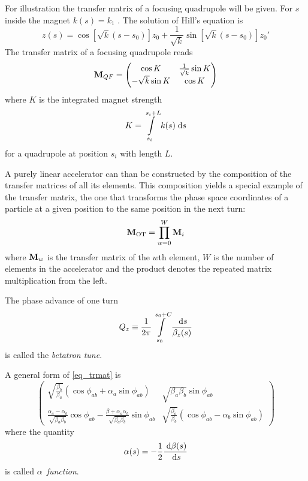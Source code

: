 For illustration the transfer matrix of a focusing quadrupole will be given.
For $s$ inside the magnet $k(s) = k_1$ . The solution of Hill's equation is
%
\begin{equation}
    z(s) = \cos \left[ \sqrt{k}(s-s_0)\right] z_0 + \frac{1}{\sqrt{k}}\sin\left[\sqrt{k}(s-s_0)\right]z_0'
\end{equation}
%
The transfer matrix of a focusing quadrupole reads
%
\begin{equation}
    \mathbf{M}_{QF} =
    \begin{pmatrix}
        \cos K & \frac{1}{\sqrt{k}} \sin K \\
        -\sqrt{k}\sin K & \cos K
    \end{pmatrix}
\end{equation}
%
where $K$ is the integrated magnet strength
%
\begin{equation}
    K = \int\limits_{s_i}^{s_i + L} k(s)\;\text{d} s
\end{equation}
%
for a quadrupole at position $s_i$ with length $L$.

A purely linear accelerator can than be constructed by the composition of the transfer matrices of 
all its elements. This composition yields a special example of the transfer matrix, the one that
transforms the phase space coordinates of a particle at a given position to the same position in the
next turn:
%
\begin{equation}
    \mathbf{M}_\text{OT} = \prod\limits_{w=0}^W \mathbf{M}_i
\end{equation}
%
where $\mathbf{M}_w$ is the transfer matrix of the $w$th element, $W$ is the number of elements in the
accelerator and the product denotes the repeated matrix multiplication from the left.

The phase advance of one turn
%
\begin{equation}
    Q_z \equiv \frac{1}{2\pi}\int\limits_{s_0}^{s_0+C} \frac{\;\text{d} s}{\beta_z(s)}
\end{equation}
%
is called the \emph{betatron tune}.

A general form of \eqref{eq_trmat} is 
%
\begin{equation}
    \begin{pmatrix}
        \sqrt{\frac{\beta_b}{\beta_a}}(\cos\phi_{ab} + \alpha_a \sin\phi_{ab}) &
        \sqrt{\beta_a\beta_b} \sin\phi_{ab} \\
        \frac{\alpha_a - \alpha_b}{\sqrt{\beta_a\beta_b}}\cos\phi_{ab} - \frac{\beta+\alpha_a\alpha_b}{\sqrt{\beta_a\beta_b}}\sin\phi_{ab} &
        \sqrt{\frac{\beta_a}{\beta_b}}(\cos\phi_{ab} - \alpha_b\sin\phi_{ab})
    \end{pmatrix}
    \label{eq_trmat_01}
\end{equation}
%
where the quantity
%
\begin{equation}
    \alpha(s) = -\frac{1}{2}\frac{\;\text{d} \beta(s)}{ \;\text{d} s}
    \label{eq_alpha}
\end{equation}
%
is called $\alpha$~\emph{function}.


